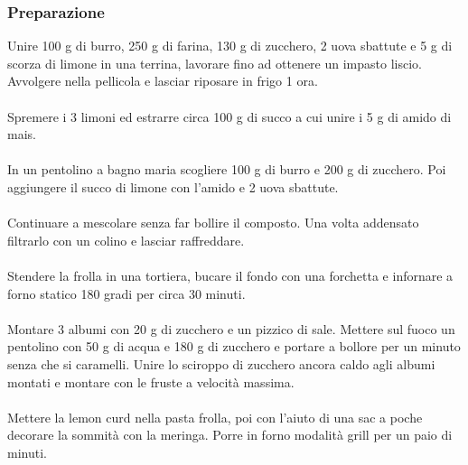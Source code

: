 \documentclass[12pt, a4paper]{article}
\begin{document}
\subsubsection{Preparazione}
Unire 100 g di burro, 250 g di farina, 130 g di zucchero, 2 uova sbattute e 5 g di scorza di limone in
una terrina, lavorare fino ad ottenere un impasto liscio. Avvolgere nella pellicola e lasciar riposare in frigo
1 ora.\\\\
Spremere i 3 limoni ed estrarre circa 100 g di succo a cui unire i 5 g di amido di mais.\\\\
In un pentolino a bagno maria scogliere 100 g di burro e 200 g di zucchero. Poi aggiungere il succo di limone con
l'amido e 2 uova sbattute.\\\\
Continuare a mescolare senza far bollire il composto. Una volta addensato filtrarlo con un colino e 
lasciar raffreddare.\\\\
Stendere la frolla in una tortiera, bucare il fondo con una forchetta e infornare a forno statico 180 gradi per circa 30 minuti.\\\\
Montare 3 albumi con 20 g di zucchero e un pizzico di sale. Mettere sul fuoco un pentolino con 50 g di acqua e 180 g di zucchero e
portare a bollore per un minuto senza che si caramelli. Unire lo sciroppo di zucchero ancora caldo agli albumi montati e montare con le
fruste a velocità massima.\\\\
Mettere la lemon curd nella pasta frolla, poi con l'aiuto di una sac a poche decorare la sommità con la meringa. Porre in forno modalità
grill per un paio di minuti.
\clearpage
\end{document}
